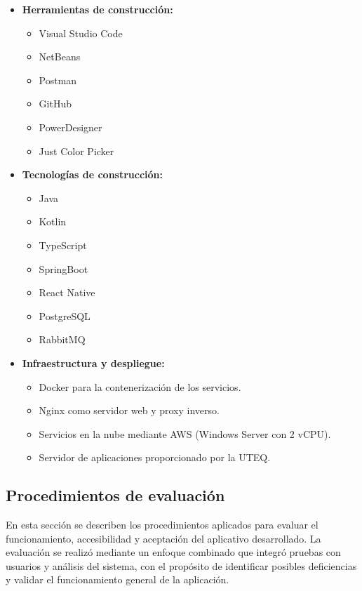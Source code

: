 \documentclass[lettersize,journal]{IEEEtran}
\begin{document}
        \begin{itemize}
        	\item \textbf{Herramientas de construcción:}
        	\begin{itemize}
        		\item Visual Studio Code
        		\item NetBeans
        		\item Postman
        		\item GitHub
        		\item PowerDesigner
        		\item Just Color Picker
        	\end{itemize}
        	
        	\item \textbf{Tecnologías de construcción:}
        	\begin{itemize}
        		\item Java
        		\item Kotlin
        		\item TypeScript
        		\item SpringBoot
        		\item React Native
        		\item PostgreSQL
        		\item RabbitMQ
        	\end{itemize}
        	
        	\item \textbf{Infraestructura y despliegue:}
        	\begin{itemize}
        		\item Docker para la contenerización de los servicios.
        		\item Nginx como servidor web y proxy inverso.
        		\item Servicios en la nube mediante AWS (Windows Server con 2 vCPU).
        		\item Servidor de aplicaciones proporcionado por la UTEQ.
        	\end{itemize}
        \end{itemize}
        
        
        \subsection{Procedimientos de evaluación}
        
        En esta sección se describen los procedimientos aplicados para evaluar el funcionamiento, accesibilidad y aceptación del aplicativo desarrollado. La evaluación se realizó mediante un enfoque combinado que integró pruebas con usuarios y análisis del sistema, con el propósito de identificar posibles deficiencias y validar el funcionamiento general de la aplicación.
        
\end{document}
